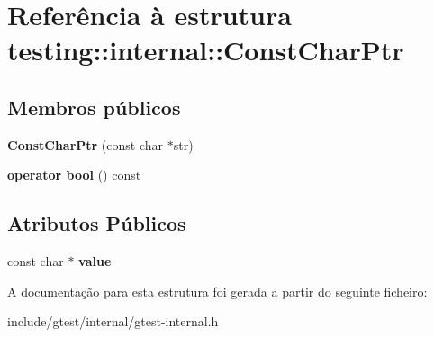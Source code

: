 \hypertarget{structtesting_1_1internal_1_1ConstCharPtr}{\section{Referência à estrutura testing\-:\-:internal\-:\-:Const\-Char\-Ptr}
\label{structtesting_1_1internal_1_1ConstCharPtr}
}
\subsection*{Membros públicos}
\begin{DoxyCompactItemize}
\item 
\hypertarget{structtesting_1_1internal_1_1ConstCharPtr_ae94f6453fa679d815994eccc63062907}{{\bfseries Const\-Char\-Ptr} (const char $\ast$str)}\label{structtesting_1_1internal_1_1ConstCharPtr_ae94f6453fa679d815994eccc63062907}

\item 
\hypertarget{structtesting_1_1internal_1_1ConstCharPtr_a891bc286350b81d1a147101c0bae5b1d}{{\bfseries operator bool} () const }\label{structtesting_1_1internal_1_1ConstCharPtr_a891bc286350b81d1a147101c0bae5b1d}

\end{DoxyCompactItemize}
\subsection*{Atributos Públicos}
\begin{DoxyCompactItemize}
\item 
\hypertarget{structtesting_1_1internal_1_1ConstCharPtr_adba40d23d5986904b605946f643cf26e}{const char $\ast$ {\bfseries value}}\label{structtesting_1_1internal_1_1ConstCharPtr_adba40d23d5986904b605946f643cf26e}

\end{DoxyCompactItemize}


A documentação para esta estrutura foi gerada a partir do seguinte ficheiro\-:\begin{DoxyCompactItemize}
\item 
include/gtest/internal/gtest-\/internal.\-h\end{DoxyCompactItemize}
